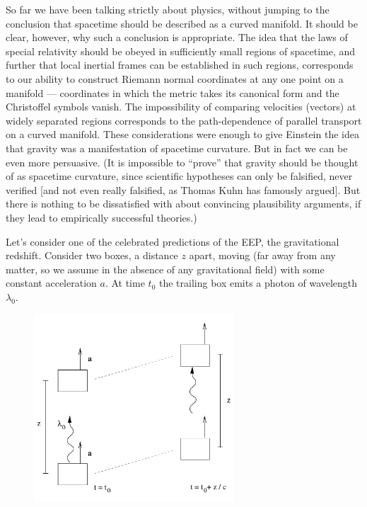 \documentclass[12pt]{article}
\begin{document}
So far we have been talking strictly about physics, without jumping
to the conclusion that spacetime should be described as a curved manifold.
It should be clear, however, why such a conclusion is appropriate.
The idea that the laws of special relativity should be obeyed in
sufficiently small regions of spacetime, and further that local inertial 
frames can be established in such regions, corresponds to our ability
to construct Riemann normal coordinates at any one point on a manifold ---
coordinates in which the metric takes its canonical form and the Christoffel 
symbols vanish.  The impossibility of comparing velocities (vectors) at 
widely separated regions corresponds to the path-dependence of 
parallel transport on a curved manifold.  These considerations were
enough to give Einstein the idea that gravity was a manifestation of
spacetime curvature.  But in fact we can be even more persuasive.
(It is impossible to ``prove'' that gravity should be thought of as
spacetime curvature, since scientific hypotheses can only be falsified,
never verified [and not even really falsified, as Thomas Kuhn has famously
argued].  But there is nothing to be dissatisfied with about convincing
plausibility arguments, if they lead to empirically successful theories.)

Let's consider one of the celebrated predictions of the EEP, the
gravitational redshift.  Consider two boxes, a distance $z$ apart,
moving (far away from any matter, so we assume in the absence of any
gravitational field) with some constant acceleration $a$.  At
time $t_0$ the trailing box emits a photon of wavelength $\lambda_0$.

\eject

\begin{figure}
  \centerline{
  \includegraphics[height=7cm]{pdf/four4}}
\end{figure}
\end{document}
